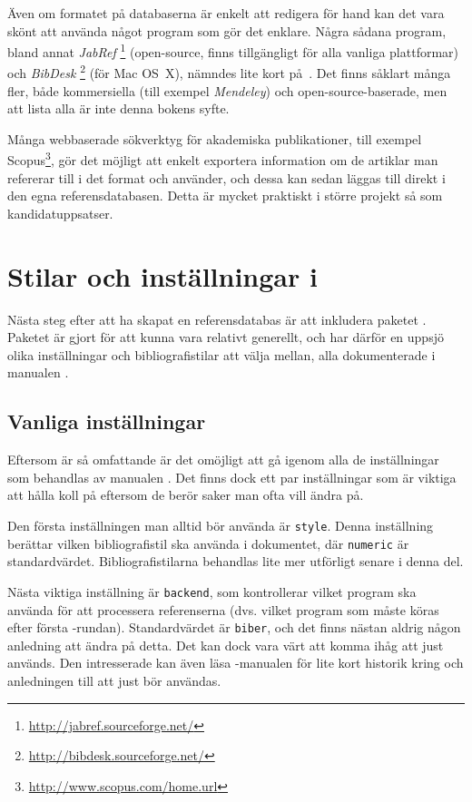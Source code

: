 \documentclass[10pt,../../a4.tex]{subfiles}
\begin{document}
Även om formatet på databaserna är enkelt att redigera för hand kan det
vara skönt att använda något program som gör det enklare. Några sådana
program, bland annat \emph{JabRef}%
\footnote{\url{http://jabref.sourceforge.net/}} (open-source, finns 
tillgängligt för alla vanliga plattformar) och \emph{BibDesk}%
\footnote{\url{http://bibdesk.sourceforge.net/}} (för Mac OS~X), nämndes
lite kort på~. Det finns såklart många fler, både
kommersiella (till exempel \emph{Mendeley}) och open-source-baserade, 
men att lista alla är inte denna bokens syfte.

Många webbaserade sökverktyg för akademiska publikationer, till exempel
Scopus\footnote{\url{http://www.scopus.com/home.url}}, gör det möjligt att
enkelt exportera information om de artiklar man refererar till i det
format \BibTeX{} och  använder, och dessa kan sedan
läggas till direkt i den egna referensdatabasen.
Detta är mycket praktiskt i större projekt så som kandidatuppsatser.

\section{Stilar och inställningar i }
Nästa steg efter att ha skapat en referensdatabas är att inkludera
paketet . Paketet är gjort för att kunna vara relativt
generellt, och har därför en uppsjö olika inställningar och
bibliografistilar att välja mellan, alla dokumenterade i manualen
\parencite{Lehman13}.

\subsection{Vanliga inställningar}
Eftersom  är så omfattande är det omöjligt att gå igenom
alla de inställningar som behandlas av manualen \parencite{Lehman13}. Det
finns dock ett par inställningar som är viktiga att hålla koll på eftersom
de berör saker man ofta vill ändra på.

Den första inställningen man alltid bör använda är \texttt{style}. Denna
inställning berättar vilken bibliografistil  ska använda
i dokumentet, där \texttt{numeric} är standardvärdet. Bibliografistilarna
behandlas lite mer utförligt senare i denna del.

Nästa viktiga inställning är \texttt{backend}, som kontrollerar vilket
program  ska använda för att processera referenserna
(dvs. vilket program som måste köras efter första \pdfLaTeX-rundan).
Standardvärdet är \texttt{biber}, och det finns nästan aldrig någon
anledning att ändra på detta. Det kan dock vara värt att komma ihåg
att just  används. Den intresserade kan även läsa
-manualen \parencite[\ppno~3\psqq]{Kime13} för lite kort
historik kring  och anledningen till att just 
bör användas.
\end{document}
